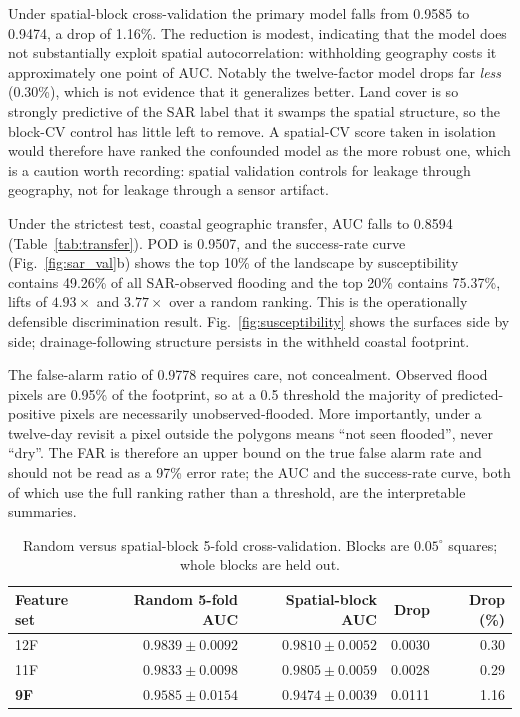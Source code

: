 \documentclass[10pt,twocolumn]{article}
\begin{document}
Under spatial-block cross-validation the primary model falls from 0.9585 to
0.9474, a drop of 1.16\%. The reduction is modest, indicating that the model
does not substantially exploit spatial autocorrelation: withholding geography
costs it approximately one point of AUC. Notably the twelve-factor model drops far \emph{less}
(0.30\%), which is not evidence that it generalizes better. Land cover is so
strongly predictive of the SAR label that it swamps the spatial structure, so the
block-CV control has little left to remove. A spatial-CV score taken in isolation
would therefore have ranked the confounded model as the more robust one, which is
a caution worth recording: spatial validation controls for leakage through
geography, not for leakage through a sensor artifact.

Under the strictest test, coastal geographic transfer, AUC falls to 0.8594
(Table~\ref{tab:transfer}). POD is 0.9507, and the success-rate curve
(Fig.~\ref{fig:sar_val}b) shows the top 10\% of the landscape by susceptibility
contains 49.26\% of all SAR-observed flooding and the top 20\% contains 75.37\%,
lifts of $4.93\times$ and $3.77\times$ over a random ranking. This is the
operationally defensible discrimination result. Fig.~\ref{fig:susceptibility}
shows the surfaces side by side; drainage-following structure persists in the
withheld coastal footprint.

The false-alarm ratio of 0.9778 requires care, not concealment. Observed
flood pixels are 0.95\% of the footprint, so at a 0.5 threshold the majority of
predicted-positive pixels are necessarily unobserved-flooded. More importantly,
under a twelve-day revisit a pixel outside the polygons means ``not seen
flooded'', never ``dry''. The FAR is therefore an upper bound on the true false
alarm rate and should not be read as a 97\% error rate; the AUC and the
success-rate curve, both of which use the full ranking rather than a threshold,
are the interpretable summaries.

\begin{table}[!t]
\centering\footnotesize
\caption{Random versus spatial-block 5-fold cross-validation. Blocks are
$0.05^\circ$ squares; whole blocks are held out.}
\label{tab:spatial}
\small
\begin{tabular}{@{}lrrrr@{}}
\toprule
\textbf{Feature set} & \textbf{Random 5-fold AUC} & \textbf{Spatial-block AUC} &
\textbf{Drop} & \textbf{Drop (\%)} \\
\midrule
12F & $0.9839\pm0.0092$ & $0.9810\pm0.0052$ & 0.0030 & 0.30 \\
11F & $0.9833\pm0.0098$ & $0.9805\pm0.0059$ & 0.0028 & 0.29 \\
\textbf{9F} & $0.9585\pm0.0154$ & $0.9474\pm0.0039$ & 0.0111 & 1.16 \\
\bottomrule
\end{tabular}
\end{table}
\end{document}
